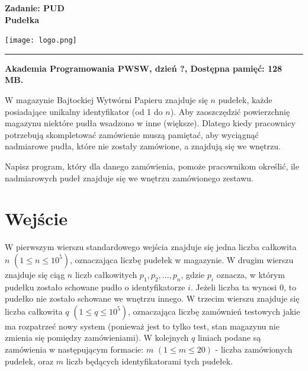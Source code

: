 \documentclass[10pt]{article}
\begin{document}
    

    \noindent
    \begin{minipage}{0.5\textwidth}
        \LARGE{\textsf{\textbf{Zadanie: PUD\\Pudełka}}}
    \end{minipage}
    \begin{minipage}{0.5\textwidth}
        \begin{flushright}
            \texttt{[image: logo.png]}
        \end{flushright}
    \end{minipage}
    
    \noindent\rule{\textwidth}{0.4pt}
    
    \noindent\textbf{Akademia Programowania PWSW, dzień ?, Dostępna pamięć: 128 MB.}
    \vspace{1em}
    
    
    \noindent
    W magazynie Bajtockiej Wytwórni Papieru znajduje się $n$ pudełek, każde posiadające unikalny identyfikator (od 1 do $n$). Aby zaoszczędzić powierzchnię magazynu niektóre pudła wsadzono w inne (większe). Dlatego kiedy pracownicy potrzebują skompletować zamówienie muszą pamiętać, aby wyciągnąć nadmiarowe pudła, które nie zostały zamówione, a znajdują się we wnętrzu.

    Napisz program, który dla danego zamówienia, pomoże pracownikom określić, ile nadmiarowych pudeł znajduje się we wnętrzu zamówionego zestawu.
    

    \section*{Wejście}
    
    W pierwszym wierszu standardowego wejścia znajduje się jedna liczba całkowita $n$ $(1\leq n\leq 10^{5})$, oznaczająca liczbę pudełek w magazynie. W drugim wierszu znajduje się ciąg $n$ liczb całkowitych $p_{1}, p_{2}, \ldots, p_{n}$, gdzie $p_{i}$ oznacza, w którym pudełku zostało schowane pudło o identyfikatorze $i$. Jeżeli liczba ta wynosi 0, to pudełko nie zostało schowane we wnętrzu innego. W trzecim wierszu znajduje się liczba całkowita $q$ $(1\leq q\leq 10^{5})$, oznaczająca liczbę zamównień testowych jakie ma rozpatrzeć nowy system (ponieważ jest to tylko test, stan magazynu nie zmienia się pomiędzy zamówieniami). W kolejnych $q$ liniach podane są zamówienia w następującym formacie: $m$ $(1 \leq m \leq 20)$ - liczba zamówionych pudełek, oraz $m$ liczb będących identyfikatorami tych pudełek.
\end{document}
